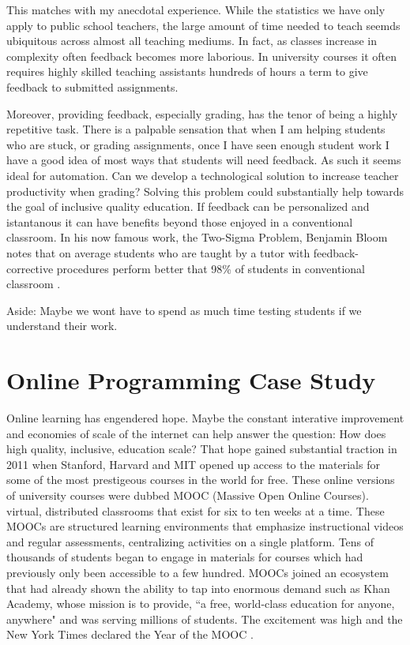 This matches with my anecdotal experience. While the statistics we have only apply to public school teachers, the large amount of time needed to teach seemds ubiquitous across almost all teaching mediums. In fact, as classes increase in complexity often feedback becomes more laborious. In university courses it often requires highly skilled teaching assistants hundreds of hours a term to give feedback to submitted assignments.

Moreover, providing feedback, especially grading, has the tenor of being a highly repetitive task. There is a palpable sensation that when I am helping students who are stuck, or grading assignments, once I have seen enough student work I have a good idea of most ways that students will need feedback. As such it seems ideal for automation. Can we develop a technological solution to increase teacher productivity when grading? Solving this problem could substantially help towards the goal of inclusive quality education. If feedback can be personalized and istantanous it can have benefits beyond those enjoyed in a conventional classroom. In his now famous work, the Two-Sigma Problem, Benjamin Bloom notes that on average students who are taught by a tutor with feedback-corrective procedures perform better that 98\% of students in conventional classroom \cite{corbett2001cognitive}.

Aside: Maybe we wont have to spend as much time testing students if we understand their work.  

\section{Online Programming Case Study}

Online learning has engendered hope. Maybe the constant interative improvement and economies of scale of the internet can help answer the question: How does high quality, inclusive, education scale? 
That hope gained substantial traction in 2011 when Stanford, Harvard and MIT opened up access to the materials for some of the most prestigeous courses in the world for free. These online versions of university courses were dubbed MOOC (Massive Open Online Courses).  virtual, distributed classrooms that
exist for six to ten weeks at a time. These MOOCs are
structured learning environments that emphasize instructional
videos and regular assessments, centralizing activities
on a single platform. Tens of thousands of students began to engage in materials for courses which had previously only been accessible to a few hundred. MOOCs joined an ecosystem that had already shown the ability to tap into enormous demand such as Khan Academy, whose mission is to provide, ``a free, world-class education for anyone, anywhere" and was serving millions of students. The excitement was high and the New York Times declared the Year of the MOOC \cite{}. 

